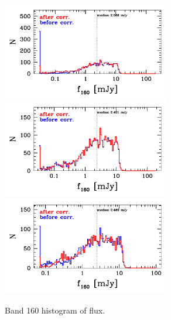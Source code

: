\documentclass[11pt,a4paper]{article}
\begin{document}
\begin{figure}[H]
	\caption{
		Band 160 histogram of flux.
	}
	\includegraphics[width=0.65\textwidth]{galsim_160_hist_flux_1}
	\includegraphics[width=0.65\textwidth]{galsim_160_hist_flux_2}
	\includegraphics[width=0.65\textwidth]{galsim_160_hist_flux_3}
\end{figure}
\end{document}
